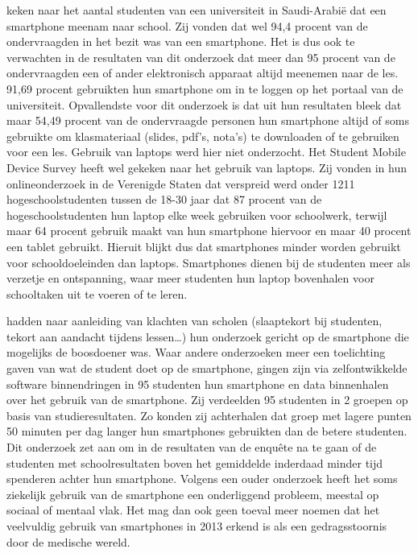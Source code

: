 \textcite{Alfawareh2014} keken naar het aantal studenten van een universiteit in Saudi-Arabië dat een smartphone meenam naar school. Zij vonden dat wel 94,4 procent van de ondervraagden in het bezit was van een smartphone. Het is dus ook te verwachten in de resultaten van dit onderzoek dat meer dan 95 procent van de ondervraagden een of ander elektronisch apparaat altijd meenemen naar de les. 91,69 procent gebruikten hun smartphone om in te loggen op het portaal van de universiteit. Opvallendste voor dit onderzoek is dat uit hun resultaten bleek dat maar 54,49 procent van de ondervraagde personen hun smartphone altijd of soms gebruikte om klasmateriaal (slides, pdf’s, nota’s) te downloaden of te gebruiken voor een les. Gebruik van laptops werd hier niet onderzocht. Het Student Mobile Device Survey \autocite{Harris2015} heeft wel gekeken naar het gebruik van laptops. Zij vonden in hun onlineonderzoek in de Verenigde Staten dat verspreid werd onder 1211 hogeschoolstudenten tussen de 18-30 jaar dat 87 procent van de hogeschoolstudenten hun laptop elke week gebruiken voor schoolwerk, terwijl maar 64 procent gebruik maakt van hun smartphone hiervoor en maar 40 procent een tablet gebruikt. Hieruit blijkt dus dat smartphones minder worden gebruikt voor schooldoeleinden dan laptops. Smartphones dienen bij de studenten meer als verzetje en ontspanning, waar meer studenten hun laptop bovenhalen voor schooltaken uit te voeren of te leren.

\textcite{Lee2014} hadden naar aanleiding van klachten van scholen (slaaptekort bij studenten, tekort aan aandacht tijdens lessen…) hun onderzoek gericht op de smartphone die mogelijks de boosdoener was. Waar andere onderzoeken meer een toelichting gaven van wat de student doet op de smartphone, gingen zijn via zelfontwikkelde software binnendringen in 95 studenten hun smartphone en data binnenhalen over het gebruik van de smartphone. Zij verdeelden 95 studenten in 2 groepen op basis van studieresultaten. Zo konden zij achterhalen dat groep met lagere punten 50 minuten per dag langer hun smartphones gebruikten dan de betere studenten. Dit onderzoek zet aan om in de resultaten van de enquête na te gaan of de studenten met schoolresultaten boven het gemiddelde inderdaad minder tijd spenderen achter hun smartphone.
Volgens een ouder onderzoek \autocite{Morahan-Martin1999} heeft het soms ziekelijk gebruik van de smartphone een onderliggend probleem, meestal op sociaal of mentaal vlak. Het mag dan ook geen toeval meer noemen dat het veelvuldig gebruik van smartphones in 2013 erkend is als een gedragsstoornis door de medische wereld.  

